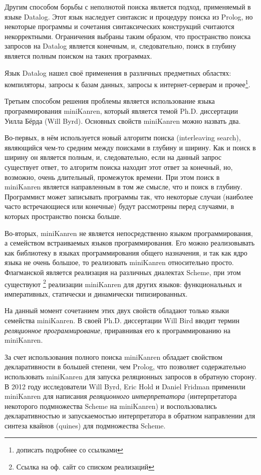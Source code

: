 Другим способом борьбы с неполнотой поиска является подход, применяемый в языке Datalog. Этот язык наследует синтаксис и процедуру поиска из Prolog, но некоторые программы и сочетания синтаксических конструкций считаются некорректными. Ограничения выбраны таким образом, что пространство поиска запросов на Datalog является конечным, и, следовательно, поиск в глубину является полным поиском на таких программах. 

Язык Datalog нашел своё применения в различных предметных областях: компиляторы, запросы к базам данных, запросы к интернет-серверам и прочее\footnote{дописать подробнее со ссылками}.

Третьим способом решения проблемы является использование языка программирования miniKanren, который является темой Ph.D. диссертации Уилла Бёрда (Will Byrd). Основных свойств miniKanren можно назвать два.

Во-первых, в нём используется новый алгоритм поиска (interleaving search), являющийся чем-то средним между поисками в глубину и ширину. Как и поиск в ширину он является полным, и, следовательно, если на данный запрос существует ответ, то алгоритм поиска находит этот ответ за конечный, но, возможно, очень длительный, промежуток времени. При этом поиск в miniKanren является направленным в том же смысле, что и поиск в глубину. Программист может записывать программы так, что некоторые случаи (наиболее часто встречающиеся или конечные) будут рассмотрены перед случаями, в которых пространство поиска больше.

Во-вторых, miniKanren не является непосредственно языком программирования, а семейством встраиваемых языков программирования. Его можно реализовывать как библиотеку в языках программирования общего назначения, и так как ядро языка не очень большое, то реализовать miniKanren относительно просто. Флагманской является реализация на различных диалектах Scheme, при этом существуют \footnote{Ссылка на оф. сайт со списком реализаций} реализации miniKanren для других языков: функциональных и императивных, статически и динамически типизированных.

На данный момент сочетанием этих двух свойств обладают только языки семейства miniKanren. В своей Ph.D. диссертации Will Bird вводит термин \emph{реляционное программирование}, приравнивая его к программированию на miniKanren.

За счет использования полного поиска miniKanren обладает свойством декларативности в большей степени, чем Prolog, что позволяет содержательно использовать miniKanren для запуска реляционных запросов в обратную сторону. В 2012 году исследователи Will Byrd, Eric Hold и Daniel Fridman применили miniKanren для написания \emph{реляционного интерпретатора} (интерпретатора некоторого подмножества Scheme на miniKanren) и воспользовались декларативностью и запускаемостью интерпретатора в обратном направлении для синтеза квайнов (quines) для подмножества Scheme.

